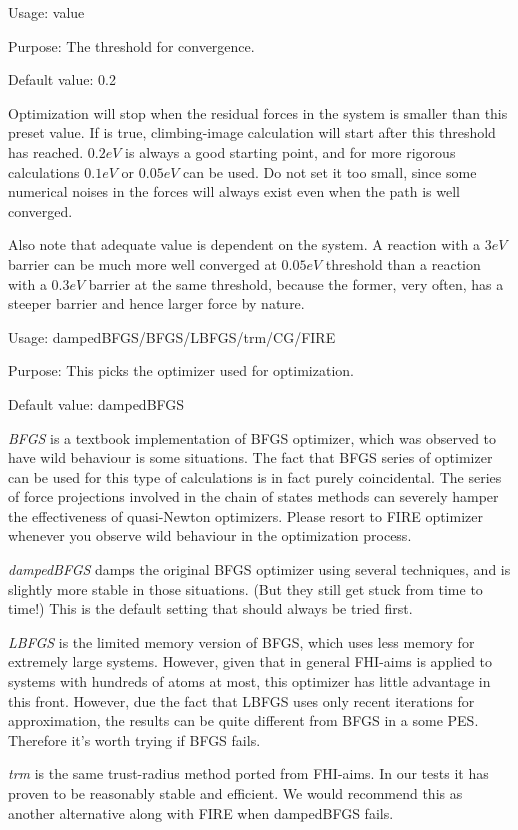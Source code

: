 {
Usage:  value


Purpose: The threshold for convergence. 

Default value: 0.2
}
Optimization will stop when the residual forces in the system is smaller than this preset value. If  is true, climbing-image calculation will start after this threshold has reached. $0.2eV$ is always a good starting point, and for more rigorous calculations $0.1eV$ or $0.05eV$ can be used. Do not set it too small, since some numerical noises in the forces will always exist even when the path is well converged.  

Also note that adequate value is dependent on the system. A reaction with a $3 eV$ barrier can be much more well converged at $0.05 eV$ threshold than a reaction with a $0.3 eV$ barrier at the same threshold, because the former, very often, has a steeper barrier and hence larger force by nature. 

{
Usage:  dampedBFGS/BFGS/LBFGS/trm/CG/FIRE


Purpose: This picks the optimizer used for optimization. 

Default value: dampedBFGS
}


\textit{BFGS} is a textbook implementation of BFGS optimizer, which was observed to have wild behaviour is some situations. The fact that BFGS series of optimizer can be used for this type of calculations is in fact purely coincidental. The series of force projections involved in the chain of states methods can severely hamper the effectiveness of quasi-Newton optimizers. Please resort to FIRE optimizer whenever you observe wild behaviour in the optimization process. 


\textit{dampedBFGS} damps the original BFGS optimizer using several techniques, and is slightly more stable in those situations. (But they still get stuck from time to time!) This is the default setting that should always be tried first.


\textit{LBFGS} is the limited memory version of BFGS, which uses less memory for extremely large systems. However, given that in general FHI-aims is applied to systems with hundreds of atoms at most, this optimizer has little advantage in this front. However, due the fact that LBFGS uses only recent iterations for approximation, the results can be quite different from BFGS in a some PES. Therefore it's worth trying if BFGS fails.

\textit{trm} is the same trust-radius method ported from FHI-aims. In our tests it has proven to be reasonably stable and efficient. We would recommend this as another alternative along with FIRE when dampedBFGS fails.

